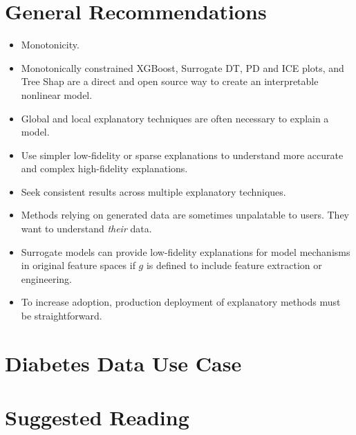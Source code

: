 \documentclass{article}
\begin{document}
\section{General Recommendations} \label{sec:gen_rec}

\begin{itemize}
	
	\item Monotonicity.	
	
	\item Monotonically constrained XGBoost, Surrogate DT, PD and ICE plots, and Tree Shap are a direct and open source way to create an interpretable nonlinear model.
	
	\item Global and local explanatory techniques are often necessary to explain a model.
	
	\item Use simpler low-fidelity or sparse explanations to understand more accurate and complex high-fidelity explanations.  
	
	\item Seek consistent results across multiple explanatory techniques. 
	
	\item Methods relying on generated data are sometimes unpalatable to users. They want to understand \textit{their} data.
	
	\item Surrogate models can provide low-fidelity explanations for model mechanisms in original feature spaces if $g$ is defined to include feature extraction or engineering.
	
	\item To increase adoption, production deployment of explanatory methods must be straightforward.
	
\end{itemize}

\section{Diabetes Data Use Case} \label{sec:use_case}

\section{Suggested Reading} \label{sec:suggested}
\end{document}
